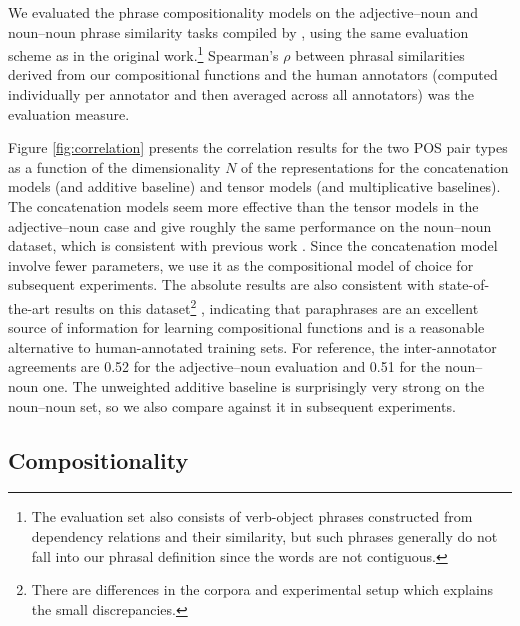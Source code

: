 \documentclass[11pt,letterpaper]{article}
\begin{document}
We evaluated the phrase compositionality models on the adjective--noun and noun--noun phrase similarity tasks compiled by , using the same evaluation scheme as in the original work.\footnote{The evaluation set also consists of verb-object phrases constructed from dependency relations and their similarity, but such phrases generally do not fall into our phrasal definition since the words are not contiguous.}
Spearman's $\rho$ between phrasal similarities derived from our compositional functions and the human annotators (computed individually per annotator and then averaged across all annotators) was the evaluation measure. 

Figure \ref{fig:correlation} presents the correlation results for the two POS pair types as a function of the dimensionality $N$ of the representations for the concatenation models (and additive baseline) and tensor models (and multiplicative baselines). 
The concatenation models seem more effective than the tensor models in the adjective--noun case and give roughly the same performance on the noun--noun dataset, which is consistent with previous work \cite{Guevara2011}. 
Since the concatenation model involve fewer parameters, we use it as the compositional model of choice for subsequent experiments. 
The absolute results are also consistent with state-of-the-art results on this dataset\footnote{There are differences in the corpora and experimental setup which explains the small discrepancies.} \cite{Blacoe2012}, indicating that paraphrases are an excellent source of information for learning compositional functions and is a reasonable alternative to human-annotated training sets. 
For reference, the inter-annotator agreements are 0.52 for the adjective--noun evaluation and 0.51 for the noun--noun one. 
The unweighted additive baseline is surprisingly very strong on the noun--noun set, so we also compare against it in subsequent experiments. 

\subsection{Compositionality}
\label{sec:compo-eval}
\end{document}
